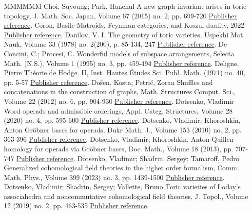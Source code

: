 \documentclass[11pt]{article}
\theoremstyle{definition}
\numberwithin{equation}{section}
\begin{document}
\begin{thebibliography}{MMMMMM}
 Choi, Suyoung; Park, Hanchul A new graph invariant arises in toric topology, J. Math. Soc. Japan, Volume 67 (2015) no. 2, pp. 699-720 \href{https://alco.centre-mersenne.org/articles/10.5802/alco.347/#MR3340192}{Publisher reference}.
 Coron, Basile Matroids, Feynman categories, and Koszul duality, 2022 \href{https://alco.centre-mersenne.org/articles/10.5802/alco.347/#CoronLattices}{Publisher reference}.
 Danilov, V. I. The geometry of toric varieties, Uspekhi Mat. Nauk, Volume 33 (1978) no. 2(200), p. 85-134, 247 \href{https://alco.centre-mersenne.org/articles/10.5802/alco.347/#MR495499}{Publisher reference}.
 De Concini, C.; Procesi, C. Wonderful models of subspace arrangements, Selecta Math. (N.S.), Volume 1 (1995) no. 3, pp. 459-494 \href{https://alco.centre-mersenne.org/articles/10.5802/alco.347/#MR1366622}{Publisher reference}.
 Deligne, Pierre Théorie de Hodge. II, Inst. Hautes Études Sci. Publ. Math. (1971) no. 40, pp. 5-57 \href{https://alco.centre-mersenne.org/articles/10.5802/alco.347/#MR498551}{Publisher reference}.
 Došen, Kosta; Petrić, Zoran Shuffles and concatenations in the construction of graphs, Math. Structures Comput. Sci., Volume 22 (2012) no. 6, pp. 904-930 \href{https://alco.centre-mersenne.org/articles/10.5802/alco.347/#MR2997505}{Publisher reference}.
 Dotsenko, Vladimir Word operads and admissible orderings, Appl. Categ. Structures, Volume 28 (2020) no. 4, pp. 595-600 \href{https://alco.centre-mersenne.org/articles/10.5802/alco.347/#MR4114993}{Publisher reference}.
 Dotsenko, Vladimir; Khoroshkin, Anton Gröbner bases for operads, Duke Math. J., Volume 153 (2010) no. 2, pp. 363-396 \href{https://alco.centre-mersenne.org/articles/10.5802/alco.347/#MR2667136}{Publisher reference}.
 Dotsenko, Vladimir; Khoroshkin, Anton Quillen homology for operads via Gröbner bases, Doc. Math., Volume 18 (2013), pp. 707-747 \href{https://alco.centre-mersenne.org/articles/10.5802/alco.347/#MR3084563}{Publisher reference}.
 Dotsenko, Vladimir; Shadrin, Sergey; Tamaroff, Pedro Generalized cohomological field theories in the higher order formalism, Comm. Math. Phys., Volume 399 (2023) no. 3, pp. 1439-1500 \href{https://alco.centre-mersenne.org/articles/10.5802/alco.347/#DSVV}{Publisher reference}.
 Dotsenko, Vladimir; Shadrin, Sergey; Vallette, Bruno Toric varieties of Loday’s associahedra and noncommutative cohomological field theories, J. Topol., Volume 12 (2019) no. 2, pp. 463-535 \href{https://alco.centre-mersenne.org/articles/10.5802/alco.347/#MR4072173}{Publisher reference}.

\end{thebibliography}
\end{document}
